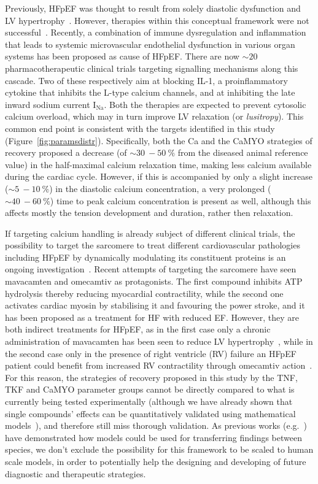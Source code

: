 Previously, HFpEF was thought to result from solely diastolic dysfunction and LV hypertrophy~\cite{Patel:2019}. However, therapies within this conceptual framework were not successful~\cite{Cleland:2014}. Recently, a combination of immune dysregulation and inflammation that leads to systemic microvascular endothelial dysfunction in various organ systems has been proposed as cause of HFpEF. There are now $\sim 20$ pharmacotherapeutic clinical trials targeting signalling mechanisms along this cascade. Two of these respectively aim at blocking IL-1, a proinflammatory cytokine that inhibits the L-type calcium channels, and at inhibiting the late inward sodium current $\text{I}_{\text{Na}}$. Both the therapies are expected to prevent cytosolic calcium overload, which may in turn improve LV relaxation (or \textit{lusitropy}). This common end point is consistent with the targets identified in this study (Figure~\ref{fig:paramsdistr}). Specifically, both the Ca and the CaMYO strategies of recovery proposed a decrease (of $\sim\SI{30}{}-\SI{50}{\percent}$ from the diseased animal reference value) in the half-maximal calcium relaxation time, making less calcium available during the cardiac cycle. However, if this is accompanied by only a slight increase ($\sim\SI{5}{}-\SI{10}{\percent}$) in the diastolic calcium concentration, a very prolonged ($\sim\SI{40}{}-\SI{60}{\percent}$) time to peak calcium concentration is present as well, although this affects mostly the tension development and duration, rather then relaxation.

If targeting calcium handling is already subject of different clinical trials, the possibility to target the sarcomere to treat different cardiovascular pathologies including HFpEF by dynamically modulating its constituent proteins is an ongoing investigation~\cite{Patel:2019}. Recent attempts of targeting the sarcomere have seen mavacamten and omecamtiv as protagonists. The first compound inhibits ATP hydrolysis thereby reducing myocardial contractility, while the second one activates cardiac myosin by stabilising it and favouring the power stroke, and it has been proposed as a treatment for HF with reduced EF. However, they are both indirect treatments for HFpEF, as in the first case only a chronic administration of mavacamten has been seen to reduce LV hypertrophy~\cite{Green:2016}, while in the second case only in the presence of right ventricle (RV) failure an HFpEF patient could benefit from increased RV contractility through omecamtiv action~\cite{Planelles-Herrero:2017}. For this reason, the strategies of recovery proposed in this study by the TNF, TKF and CaMYO parameter groups cannot be directly compared to what is currently being tested experimentally (although we have already shown that single compounds' effects can be quantitatively validated using mathematical models~\cite{Longobardi:2021}), and therefore still miss thorough validation. As previous works (e.g.~\cite{Fernandez-Chas:2018}) have demonstrated how models could be used for transferring findings between species, we don't exclude the possibility for this framework to be scaled to human scale models, in order to potentially help the designing and developing of future diagnostic and therapeutic strategies.

